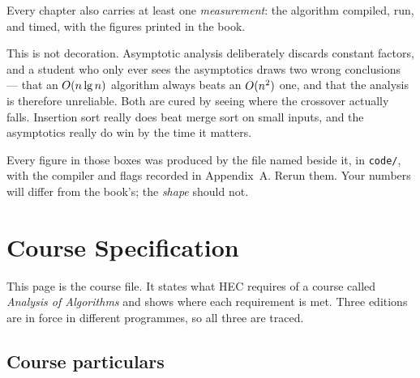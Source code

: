 \begin{alertbox}
Every chapter also carries at least one \emph{measurement}: the algorithm
compiled, run, and timed, with the figures printed in the book.

\smallskip
This is not decoration. Asymptotic analysis deliberately discards constant
factors, and a student who only ever sees the asymptotics draws two wrong
conclusions --- that an $O(n\operatorname{lg} n)$ algorithm always beats an $O(n^2)$
one, and that the analysis is therefore unreliable. Both are cured by seeing
where the crossover actually falls. Insertion sort really does beat merge sort
on small inputs, and the asymptotics really do win by the time it matters.

\smallskip
Every figure in those boxes was produced by the file named beside it, in
\texttt{code/}, with the compiler and flags recorded in Appendix~A. Rerun them.
Your numbers will differ from the book's; the \emph{shape} should not.
\end{alertbox}

\newpage

\chapter*{Course Specification}

This page is the course file. It states what HEC requires of a course called
\emph{Analysis of Algorithms} and shows where each requirement is met. Three
editions are in force in different programmes, so all three are traced.

\section*{Course particulars}

